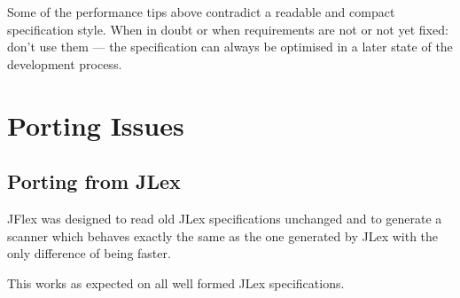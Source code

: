 \documentclass[11pt]{scrartcl}
\begin{document}
Some of the performance tips above contradict a readable and compact
specification style. When in doubt or when requirements are not or not
yet fixed: don't use them --- the specification can always be optimised
in a later state of the development process.


\section{Porting Issues}

\subsection{Porting from JLex\label{Porting}}
JFlex was designed to read old JLex specifications unchanged and to
generate a scanner which behaves exactly the same as the one generated
by JLex with the only difference of being faster.

This works as expected on all well formed JLex specifications.
\end{document}
